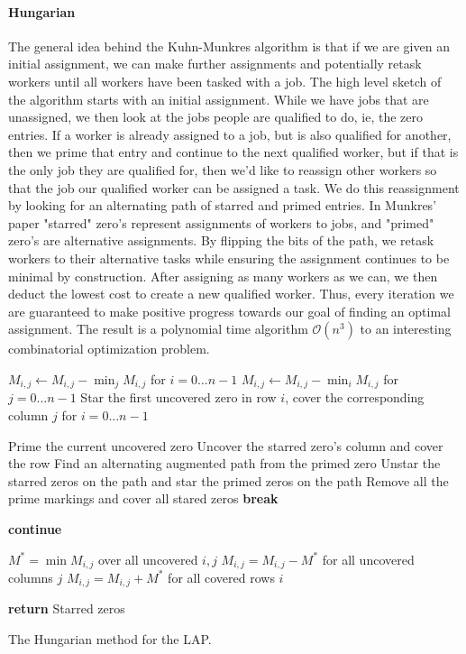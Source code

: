 \documentclass{article}
\newcommand{\boundedBy}[1]{\mathcal{O} \left ( #1 \right )}
\begin{document}
\paragraph{Hungarian} The general idea behind the Kuhn-Munkres algorithm is that if we are given an initial assignment, we can make further assignments and potentially retask workers until all workers have been tasked with a job. The high level sketch of the algorithm starts with an initial assignment. While we have jobs that are unassigned, we then look at the jobs people are qualified to do, ie, the zero entries. If a worker is already assigned to a job, but is also qualified for another, then we prime that entry and continue to the next qualified worker, but if that is the only job they are qualified for, then we'd like to reassign other workers so that the job our qualified worker can be assigned a task. We do this reassignment by looking for an alternating path of starred and primed entries. In Munkres' paper \cite{munkres1957algorithms} "starred" zero's represent assignments of workers to jobs, and "primed" zero's are alternative assignments. By flipping the bits of the path, we retask workers to their alternative tasks while ensuring the assignment continues to be minimal by construction. After assigning as many workers as we can, we then deduct the lowest cost to create a new qualified worker. Thus, every iteration we are guaranteed to make positive progress towards our goal of finding an optimal assignment. The result is a polynomial time algorithm $\boundedBy{n^3}$ to an interesting combinatorial optimization problem.

\begin{algorithm}
\begin{algorithmic}
 
\State $M_{i,j} \gets M_{i,j} - \min_j M_{i,j}$ for $ i = 0 \ldots n - 1$
\State $M_{i,j} \gets M_{i,j} - \min_i M_{i,j}$ for $ j = 0 \ldots n - 1$
\State Star the first uncovered zero in row $i$, cover the corresponding column $j$ for $ i = 0 \ldots n - 1$

		\State Prime the current uncovered zero
			\State Uncover the starred zero's column and cover the row
		\Else
			\State Find an alternating augmented path from the primed zero
			\State Unstar the starred zeros on the path and star the primed zeros on the path
			\State Remove all the prime markings and cover all stared zeros
			\State \textbf{break}
		\EndIf
	\EndWhile

		\State \textbf{continue}
	\EndIf

	\State $M^* = \min M_{i,j}$ over all uncovered $i, j$
	\State $M_{i,j} = M_{i,j} - M^*$ for all uncovered columns $j$
	\State $M_{i,j} = M_{i,j} + M^*$ for all covered rows $i$
\EndWhile

\State \textbf{return} Starred zeros 
\EndProcedure
\end{algorithmic}
\caption{The Hungarian method for the LAP.}
\label{alg:hungarian}
\end{algorithm}
\end{document}
